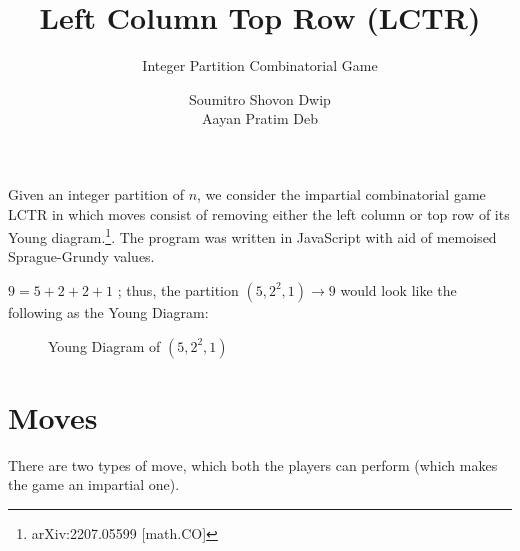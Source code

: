 \documentclass[11pt]{scrartcl}
\title{Left Column Top Row (LCTR)}
\subtitle{Integer Partition Combinatorial Game}
\author{Soumitro Shovon Dwip \\ Aayan Pratim Deb}
\begin{document}
	
	\maketitle
	
	\begin{mdframed}[style=mdpurplebox,frametitle={Game statement}]
		Given an integer partition of $n$, we consider the impartial combinatorial game LCTR in which moves consist of removing either the left column or top row of its Young diagram.\footnote[1]{arXiv:2207.05599 [math.CO]}. The program was written in JavaScript with aid of memoised Sprague-Grundy values. 	
	\end{mdframed} 
	$9 = 5 + 2 + 2 + 1 $ ; thus, the partition $( 5, 2^2, 1 ) \to 9$ would look like the following as the Young Diagram: 
	
	\begin{figure}[!ht]
		\centering
		\caption{Young Diagram of $( 5, 2^2, 1 )$}
		\end{figure}
		\section*{Moves} 
		There are two types of move, which both the players can perform (which makes the game an impartial one). 
		
\end{document}
